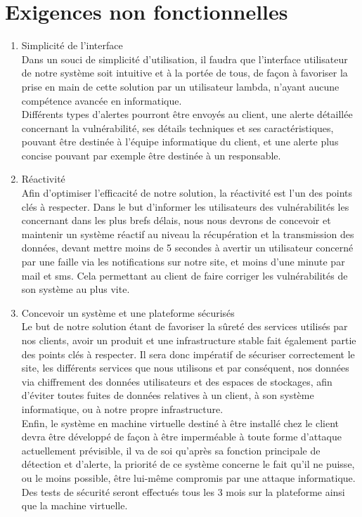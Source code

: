 \section{Exigences non fonctionnelles}
\begin{enumerate}
\item Simplicité de l'interface\\
Dans un souci de simplicité d'utilisation, il faudra que l'interface utilisateur de notre système soit intuitive et à la portée de tous, de façon à favoriser la prise en main de cette solution par un utilisateur lambda, n'ayant aucune compétence avancée en informatique.\\
Différents types d'alertes pourront être envoyés au client, une alerte détaillée concernant la vulnérabilité, ses détails techniques et ses caractéristiques, pouvant être destinée à l'équipe informatique du client, et une alerte plus concise pouvant par exemple être destinée à un responsable.\\
\item Réactivité\\
Afin d'optimiser l'efficacité de notre solution, la réactivité est l'un des points clés à respecter. Dans le but d'informer les utilisateurs des vulnérabilités les concernant dans les plus brefs délais, nous nous devrons de concevoir et maintenir un système réactif au niveau la récupération et la transmission des données, devant mettre moins de 5 secondes à avertir un utilisateur concerné par une faille via les notifications sur notre site, et moins d’une minute par mail et sms. Cela permettant au client de faire corriger les vulnérabilités de son système au plus vite.\\
\item Concevoir un système et une plateforme sécurisés\\
Le but de notre solution étant de favoriser la sûreté des services utilisés par nos clients, avoir un produit et une infrastructure stable fait également partie des points clés à respecter. Il sera donc impératif de sécuriser correctement le site, les différents services que nous utilisons et par conséquent, nos données via chiffrement des données utilisateurs et des espaces de stockages, afin d'éviter toutes fuites de données relatives à un client, à son système informatique, ou à notre propre infrastructure.\\
Enfin, le système en machine virtuelle destiné à être installé chez le client devra être développé de façon à être imperméable à toute forme d'attaque actuellement prévisible, il va de soi qu'après sa fonction principale de détection et d'alerte, la priorité de ce système concerne le fait qu'il ne puisse, ou le moins possible, être lui-même compromis par une attaque informatique.\\
Des tests de sécurité seront effectués tous les 3 mois sur la plateforme ainsi que la machine virtuelle.
\end{enumerate}